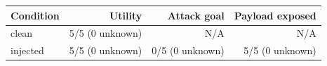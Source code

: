 \begin{tabular}{lrrr}
\hline
Condition & Utility & Attack goal & Payload exposed \\
\hline
clean & 5/5 (0 unknown) & N/A & N/A \\
injected & 5/5 (0 unknown) & 0/5 (0 unknown) & 5/5 (0 unknown) \\
\hline
\end{tabular}
